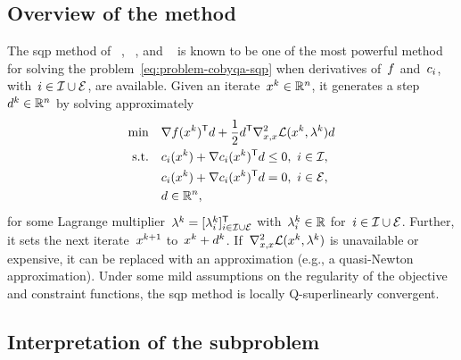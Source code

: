 \subsection{Overview of the method}

The \gls{sqp} method of \citeauthor{Wilson_1963}~\cite{Wilson_1963}, \citeauthor{Han_1976}~\cite{Han_1976,Han_1977}, and \citeauthor{Powell_1978a}~\cite{Powell_1978a,Powell_1978b} is known to be one of the most powerful method for solving the problem~\cref{eq:problem-cobyqa-sqp} when derivatives of~$f$ and~$c_{i}$, with~$i \in \mathcal{I} \cup \mathcal{E}$, are available.
Given an iterate~$\iter[k] \in \R^n$, it generates a step~$d^k \in \mathbb{R}^n$ by solving approximately
\begin{subequations}
    \label{eq:sqp-subproblem}
    \begin{align}
        \min        & \quad \nabla \obj(\iter[k])^{\T} \step + \frac{1}{2} \step^{\T} \nabla_{x, x}^2 \lag(\iter[k], \lambda^k) \step \label{eq:sqp-subproblem-obj}\\
        \text{s.t.} & \quad \con{i}(\iter[k]) + \nabla \con{i}(\iter[k])^{\T} \step \le 0, ~ i \in \iub,\\
                    & \quad \con{i}(\iter[k]) + \nabla \con{i}(\iter[k])^{\T} \step = 0, ~ i \in \ieq,\\
                    & \quad \step \in \R^n,
    \end{align}
\end{subequations}
for some Lagrange multiplier~$\lambda^k = [\lambda_i^k]_{i \in \mathcal{I} \cup \mathcal{E}}^{\mathsf{T}}$ with~$\lambda_i^k \in \mathbb{R}$ for~$i \in \mathcal{I} \cup \mathcal{E}$.
Further, it sets the next iterate~$\iter[k + 1]$ to~$\iter[k] + d^k$.
If~$\nabla_{x, x}^2 \lag(\iter[k], \lambda^k)$ is unavailable or expensive, it can be replaced with an approximation (e.g., a quasi-Newton approximation).
Under some mild assumptions on the regularity of the objective and constraint functions, the \gls{sqp} method is locally Q-superlinearly convergent.

\subsection{Interpretation of the subproblem}

